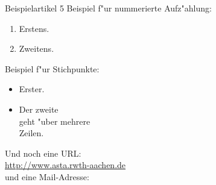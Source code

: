 
\begin{artikel}{Beispielartikel 5}
Beispiel f"ur nummerierte Aufz"ahlung:
\begin{enumerate}
\item Erstens.
\item Zweitens.
\end{enumerate}

Beispiel f"ur Stichpunkte:
\begin{itemize}
\item Erster.
\item Der zweite\\
geht "uber mehrere\\
Zeilen.
\end{itemize}

Und noch eine URL:\\
\url{http://www.asta.rwth-aachen.de}\\
und eine Mail-Adresse:\\
\end{artikel}

